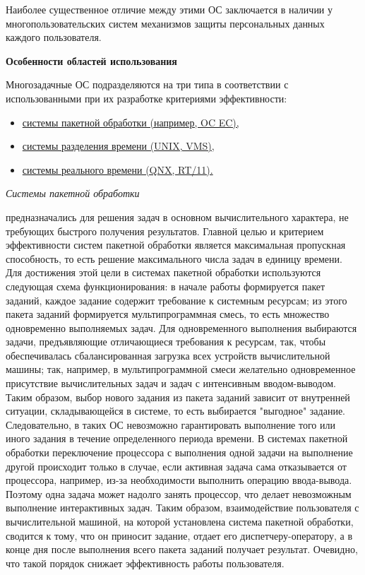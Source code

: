 Наиболее существенное отличие между этими ОС заключается в наличии у многопользовательских систем механизмов защиты персональных данных каждого пользователя.

\textbf{Особенности областей использования}

Многозадачные ОС подразделяются на три типа в соответствии с использованными при их разработке критериями эффективности:
\begin{itemize}
   \item \hyperlink{opr1_FEAT}{системы пакетной обработки (например, OC EC),}
   \item \hyperlink{opr2_FEAT}{системы разделения времени (UNIX, VMS),}
   \item \hyperlink{opr3_FEAT}{системы реального времени (QNX, RT/11).}
\end{itemize}

\hypertarget{opr1_FEAT}{\textit{Системы пакетной обработки}} предназначались для решения задач в основном вычислительного характера, не требующих быстрого получения результатов. Главной целью и критерием эффективности систем пакетной обработки является максимальная пропускная способность, то есть решение максимального числа задач в единицу времени. Для достижения этой цели в системах пакетной обработки используются следующая схема функционирования: в начале работы формируется пакет заданий, каждое задание содержит требование к системным ресурсам; из этого пакета заданий формируется мультипрограммная смесь, то есть множество одновременно выполняемых задач. Для одновременного выполнения выбираются задачи, предъявляющие отличающиеся требования к ресурсам, так, чтобы обеспечивалась сбалансированная загрузка всех устройств вычислительной машины; так, например, в мультипрограммной смеси желательно одновременное присутствие вычислительных задач и задач с интенсивным вводом-выводом. Таким образом, выбор нового задания из пакета заданий зависит от внутренней ситуации, складывающейся в системе, то есть выбирается "выгодное" задание. Следовательно, в таких ОС невозможно гарантировать выполнение того или иного задания в течение определенного периода времени. В системах пакетной обработки переключение процессора с выполнения одной задачи на выполнение другой происходит только в случае, если активная задача сама отказывается от процессора, например, из-за необходимости выполнить операцию ввода-вывода. Поэтому одна задача может надолго занять процессор, что делает невозможным выполнение интерактивных задач. Таким образом, взаимодействие пользователя с вычислительной машиной, на которой установлена система пакетной обработки, сводится к тому, что он приносит задание, отдает его диспетчеру-оператору, а в конце дня после выполнения всего пакета заданий получает результат. Очевидно, что такой порядок снижает эффективность работы пользователя.


